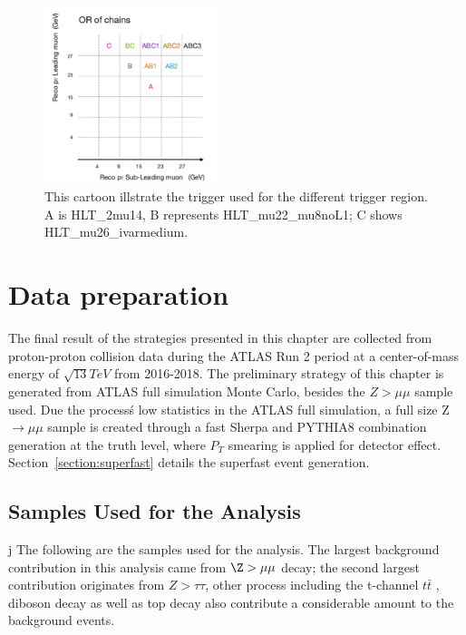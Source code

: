 \begin{figure}[!htb]
    \begin{center}
        \includegraphics[width=0.45\textwidth]{figures/chapter_dimuon/TriggerChain}        
        \caption{
        This cartoon illstrate the trigger used for the different trigger region. A is HLT\_2mu14, B represents HLT\_mu22\_mu8noL1; C shows HLT\_mu26\_ivarmedium. }
    \end{center}
\end{figure}

\section{Data preparation}
The final result of the strategies presented in this chapter are collected from proton-proton collision data during the ATLAS Run 2 period at a center-of-mass energy of $\sqrt{13} TeV$ from 2016-2018. The preliminary strategy of this chapter is generated from ATLAS full simulation Monte Carlo, besides the $Z > \mu \mu $ sample used. Due the process\'s low statistics in the ATLAS full simulation, a full size Z $\rightarrow \mu \mu$ sample is created through a fast Sherpa and PYTHIA8 combination generation at the truth level, where $P_{T}$ smearing is applied for detector effect. Section~\ref{section:superfast} details the superfast event generation.

\subsection{Samples Used for the Analysis}j
The following are the samples used for the analysis. The largest background contribution in this analysis came from $\Z > \mu\mu $ decay; the second largest contribution originates from $Z > \tau \tau$, other process including the t-channel $t\bar{t}$ , diboson decay as well as top decay also contribute a considerable amount to the background events.


